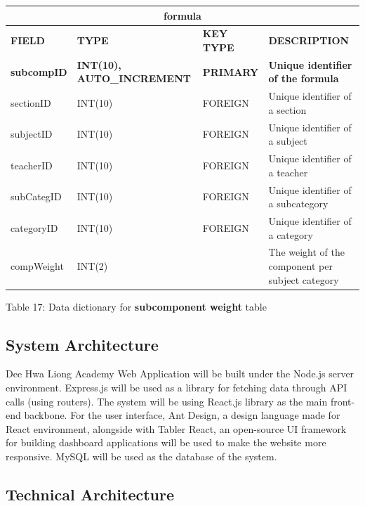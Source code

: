 \documentclass[11pt,a4paper,titlepage]{article}
\begin{document}
\vspace{1cm}
\begin{longtable}{ |p{2.5cm}|p{4.5cm}|p{2.5cm}|p{3cm}|  }
    \hline
    \multicolumn{4}{|c|}{\textbf{formula}} \\
    \hline
    \textbf{FIELD}&\textbf{TYPE}&\textbf{KEY TYPE}&\textbf{DESCRIPTION}\\
    \hline
    \textbf{subcompID}  & \textbf{INT(10), AUTO\_INCREMENT} & \textbf{PRIMARY} & \textbf{Unique identifier of the formula}\\ \hline
    sectionID & INT(10) & FOREIGN & Unique identifier of a section\\ \hline
    subjectID & INT(10) & FOREIGN & Unique identifier of a subject\\ \hline
    teacherID & INT(10) & FOREIGN & Unique identifier of a teacher\\ \hline
    subCategID & INT(10) & FOREIGN & Unique identifier of a subcategory\\ \hline
    categoryID & INT(10) & FOREIGN & Unique identifier of a category\\ \hline
    compWeight & INT(2) & & The weight of the component per subject category\\ \hline

\end{longtable}

\vspace{.5cm}
\begin{center}
    Table 17: Data dictionary for \textbf{subcomponent weight} table
\end{center}

\newpage

\subsection{System Architecture}

Dee Hwa Liong Academy Web Application will be built under the Node.js server environment. Express.js will be used as a library for fetching data through API calls (using routers). The system will be using React.js library as the main front-end backbone. For the user interface, Ant Design, a design language made for React environment, alongside with Tabler React, an open-source UI framework for building dashboard applications will be used to make the website more responsive. MySQL will be used as the database of the system.

\subsection{Technical Architecture}
\end{document}
